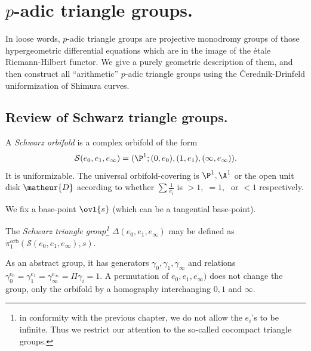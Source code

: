 \newpage
\section{$p$-adic triangle groups.}\label{sec::5}
\begin{abst}
In loose words, $p$-adic triangle groups are projective monodromy groups
of those hypergeometric differential equations which are in the image of
the \'etale Riemann-Hilbert functor. We give a purely geometric
description of them, and then construct all ``arithmetic'' $p$-adic
triangle groups using the \v{C}erednik-Drinfeld uniformization
of Shimura curves.
\end{abst}

\subsection{Review of Schwarz triangle groups.}\label{sub::5.1}

\begin{para}\label{para::5.1.1} A {\it Schwarz orbifold} is a complex orbifold
 of the form 
 \begin{equation*}
  \mathcal{S}(e_0,e_1,e_\infty)=(\P^1; (0,
   e_0), (1,e_1), (\infty, e_{\infty})).
 \end{equation*}
 It is uniformizable. The universal orbifold-covering is $\P^1, \A^1$ or 
 the open unit disk $\matheur{D}$ according to whether $\sum  \frac{1}{e_i}$ is
 $>1,\;=1,\;$ or $<1$ respectively.

 \noindent We fix a base-point $\ovl{s}$ (which can be a tangential
 base-point).
 
\medskip\noindent The {\it Schwarz triangle group\footnote{in conformity
 with the previous chapter, we do 
 not allow the $e_i$'s to be infinite. Thus we restrict our attention to
 the so-called cocompact triangle groups.}} $\Delta(e_0,e_1,e_\infty)$
 may be defined as $\pi_1^{\mathrm{orb}}(\mathcal{S}(e_0,e_1,e_\infty),s)$.

\noindent As an abstract group, it has generators 
$\gamma_0,\gamma_1, \gamma_\infty$ and relations
 $\gamma_0^{e_0}=\gamma_1^{e_1}=\gamma_\infty^{e_\infty}= \Pi \gamma_i = 
1$. A permutation of $e_0,e_1,e_\infty)$ does not change the group, only
 the orbifold by a homography interchanging 
 $0,1$ and $\infty$.  
\end{para}

